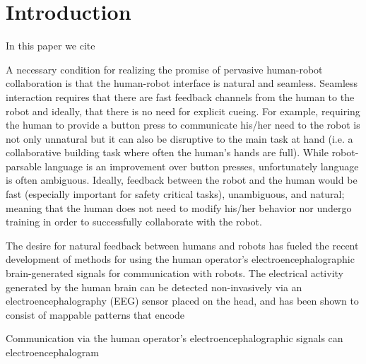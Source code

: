 \section{Introduction}

In this paper we cite~\cite{parra}

A necessary condition for realizing the promise of pervasive human-robot collaboration is that the human-robot interface is natural and seamless.  Seamless interaction requires that there are fast feedback channels from the human to the robot and ideally, that there is no need for explicit cueing.  
For example, requiring the human to provide a button press to communicate his/her need to the robot is not only unnatural but it can also be disruptive to the main task at hand (i.e. a collaborative building task where often the human's hands are full).  While robot-parsable language is an improvement over button presses, unfortunately language is often ambiguous.  Ideally, feedback between the robot and the human would be fast (especially important for safety critical tasks), unambiguous, and natural; meaning that the human does not need to modify his/her behavior nor undergo training in order to successfully collaborate with the robot.

The desire for natural feedback between humans and robots has fueled the recent development of methods for using the human operator's electroencephalographic brain-generated signals for communication with robots.  The electrical activity generated by the human brain can be detected non-invasively via an electroencephalography (EEG) sensor placed on the head, and has been shown to consist of mappable patterns that encode 


Communication via the human operator's electroencephalographic signals can  electroencephalogram